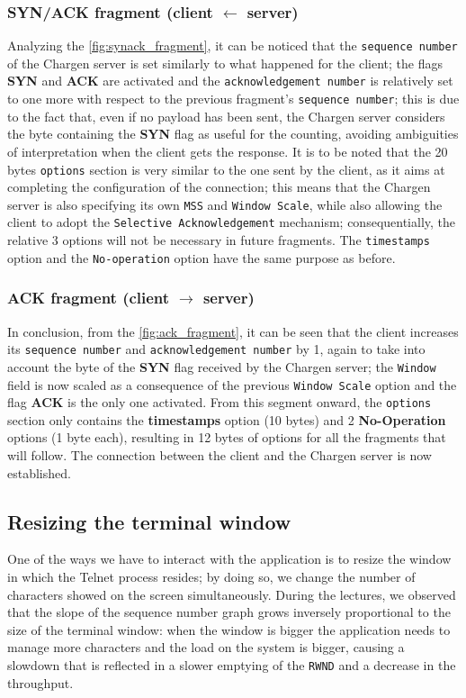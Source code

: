 \documentclass{exam}
\begin{document}
\subsubsection{SYN/ACK fragment (client $\leftarrow$ server)}
Analyzing the \ref{fig:synack_fragment}, it can be noticed that the \verb|sequence number| of the Chargen server is set similarly to what happened for the client; the flags \textbf{SYN} and \textbf{ACK} are activated and the \verb|acknowledgement number| is relatively set to one more with respect to the previous fragment's \verb|sequence number|; this is due to the fact that, even if no payload has been sent, the Chargen server considers the byte containing the \textbf{SYN} flag as useful for the counting, avoiding ambiguities of interpretation when the client gets the response. It is to be noted that the 20 bytes \verb|options| section is very similar to the one sent by the client, as it aims at completing the configuration of the connection; this means that the Chargen server is also specifying its own \verb|MSS| and \verb|Window Scale|, while also allowing the client to adopt the \verb|Selective Acknowledgement| mechanism; consequentially, the relative 3 options will not be necessary in future fragments. The \verb|timestamps| option and the \verb|No-operation| option have the same purpose as before.

\subsubsection{ACK fragment (client $\rightarrow$ server)}
In conclusion, from the \ref{fig:ack_fragment}, it can be seen that the client increases its \verb|sequence number| and \verb|acknowledgement number| by 1, again to take into account the byte of the \textbf{SYN} flag received by the Chargen server; the \verb|Window| field is now scaled as a consequence of the previous \verb|Window Scale| option and the flag \textbf{ACK} is the only one activated. From this segment onward, the \verb|options| section only contains the \textbf{timestamps} option (10 bytes) and 2 \textbf{No-Operation} options (1 byte each), resulting in 12 bytes of options for all the fragments that will follow. The connection between the client and the Chargen server is now established.


\subsection{Resizing the terminal window}\label{ssec:resizing-the-terminal-window}
One of the ways we have to interact with the application is to resize the window in which the Telnet process resides; by doing so, we change the number of characters showed on the screen simultaneously. During the lectures, we observed that the slope of the sequence number graph grows inversely proportional to the size of the terminal window: when the window is bigger the application needs to manage more characters and the load on the system is bigger, causing a slowdown that is reflected in a slower emptying of the \verb|RWND| and a decrease in the throughput.
\end{document}
